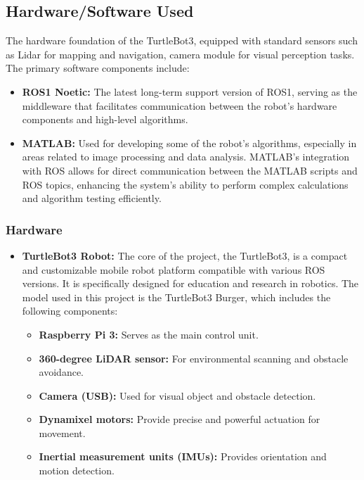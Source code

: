 \documentclass{article}
\begin{document}
	\subsection{Hardware/Software Used}
	The hardware foundation of the TurtleBot3, equipped with standard sensors such as Lidar for mapping and navigation, camera module for visual perception tasks. The primary software components include:
	\begin{itemize}
		\item \textbf{ROS1 Noetic:} The latest long-term support version of ROS1, serving as the middleware that facilitates communication between the robot's hardware components and high-level algorithms.
		\item \textbf{MATLAB:} Used for developing some of the robot's algorithms, especially in areas related to image processing and data analysis. MATLAB's integration with ROS allows for direct communication between the MATLAB scripts and ROS topics, enhancing the system's ability to perform complex calculations and algorithm testing efficiently.
	\end{itemize}
	
	\subsubsection*{Hardware}
	\begin{itemize}
		\item \textbf{TurtleBot3 Robot:} The core of the project, the TurtleBot3, is a compact and customizable mobile robot platform compatible with various ROS versions. It is specifically designed for education and research in robotics. The model used in this project is the TurtleBot3 Burger, which includes the following components:
		\begin{itemize}
			\item \textbf{Raspberry Pi 3:} Serves as the main control unit.
			\item \textbf{360-degree LiDAR sensor:} For environmental scanning and obstacle avoidance.
			\item \textbf{Camera (USB):} Used for visual object and obstacle detection.
			\item \textbf{Dynamixel motors:} Provide precise and powerful actuation for movement.
			\item \textbf{Inertial measurement units (IMUs):} Provides orientation and motion detection.
	\end{itemize}
	\end{itemize}
	
\end{document}

